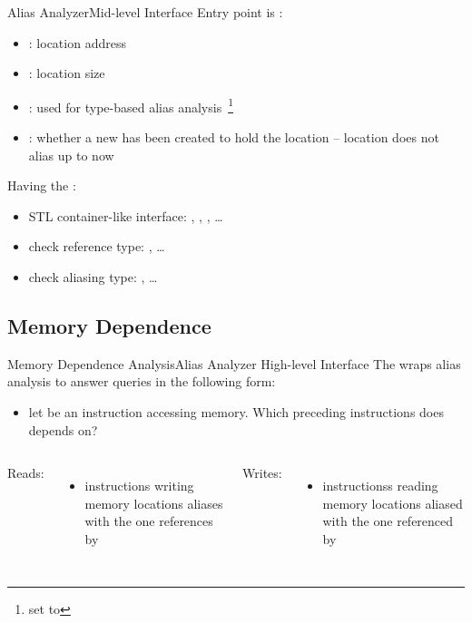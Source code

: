 \begin{frame}{Alias Analyzer}{Mid-level Interface}
Entry point is :

\begin{itemize}
\item {}: location address
\item {}: location size
\item {}: used for type-based alias
      analysis~\footnote{set to }
\item {}: whether a new  has been
      created to hold the location -- location does not alias up to now
\end{itemize}

\vfill
Having the :

\begin{itemize}
\item STL container-like interface: , ,
      , \ldots
\item check reference type: , \ldots
\item check aliasing type: , \ldots
\end{itemize}
\end{frame}


\subsection{Memory Dependence}


\begin{frame}{Memory Dependence Analysis}{Alias Analyzer High-level Interface}
The  wraps alias analysis to answer
queries in the following form:

\begin{itemize}
\item let  be an instruction accessing memory. Which
      preceding instructions does  depends on?
\end{itemize}

\vfill
\begin{columns}[t]
Reads:

\begin{itemize}
\item {} instructions writing memory locations aliases with
      the one references by 
\end{itemize}

Writes:

\begin{itemize}
\item {} instructionss reading memory locations aliased with
      the one referenced by 
\end{itemize}
\end{columns}
\end{frame}


